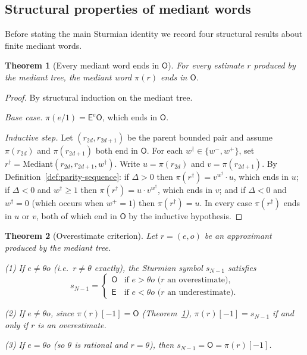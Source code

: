 \documentclass[12pt]{article}
\newtheorem{theorem}{Theorem}[section]
\theoremstyle{definition}
\theoremstyle{remark}
\theoremstyle{plain}
\newcommand{\OO}{\mathsf{O}}
\newcommand{\EE}{\mathsf{E}}
\newcommand{\Dval}{\Delta}
\newcommand{\wplus}{w^{+}}
\newcommand{\wminus}{w^{-}}
\begin{document}
\subsection{Structural properties of mediant words}

Before stating the main Sturmian identity we record four structural results
about finite mediant words.

\begin{theorem}[Every mediant word ends in $\OO$]
\label{thm:parity-ends-O}
For every estimate $r$ produced by the mediant tree, the mediant word $\pi(r)$
ends in $\OO$.
\end{theorem}

\begin{proof}
By structural induction on the mediant tree.

\emph{Base case.} $\pi(e/1) = \EE^e\OO$, which ends in $\OO$.

\emph{Inductive step.} Let $(r_{2d}, r_{2d+1})$ be the parent bounded pair and
assume $\pi(r_{2d})$ and $\pi(r_{2d+1})$ both end in $\OO$.
For each $w^\dagger \in \{\wminus, \wplus\}$, set
$r^\dagger = \mathrm{Mediant}(r_{2d}, r_{2d+1}, w^\dagger)$.
Write $u = \pi(r_{2d})$ and $v = \pi(r_{2d+1})$.
By Definition~\ref{def:parity-sequence}: if $\Dval > 0$ then
$\pi(r^\dagger) = v^{w^\dagger} \cdot u$, which ends in $u$; if $\Dval < 0$ and
$w^\dagger \geq 1$ then $\pi(r^\dagger) = u \cdot v^{w^\dagger}$, which ends in $v$;
and if $\Dval < 0$ and $w^\dagger = 0$ (which occurs when $\wplus = 1$) then
$\pi(r^\dagger) = u$.
In every case $\pi(r^\dagger)$ ends in $u$ or $v$, both of which end in $\OO$
by the inductive hypothesis.
\end{proof}

\begin{theorem}[Overestimate criterion]
\label{thm:last-sturmian}
Let $r = (e, o)$ be an approximant produced by the mediant tree.

\textup{(1)} If $e \neq \theta o$ (i.e.\ $r \neq \theta$ exactly), the Sturmian symbol
$s_{N-1}$ satisfies
\[
  s_{N-1} = \begin{cases} \OO & \text{if } e > \theta o \text{ ($r$ an overestimate),} \\
                           \EE & \text{if } e < \theta o \text{ ($r$ an underestimate).} \end{cases}
\]

\textup{(2)} If $e \neq \theta o$, since $\pi(r)[-1] = \OO$
(Theorem~\ref{thm:parity-ends-O}), $\pi(r)[-1] = s_{N-1}$ if and only if $r$ is an
overestimate.

\textup{(3)} If $e = \theta o$ (so $\theta$ is rational and $r = \theta$), then
$s_{N-1} = \OO = \pi(r)[-1]$.
\end{theorem}
\end{document}
